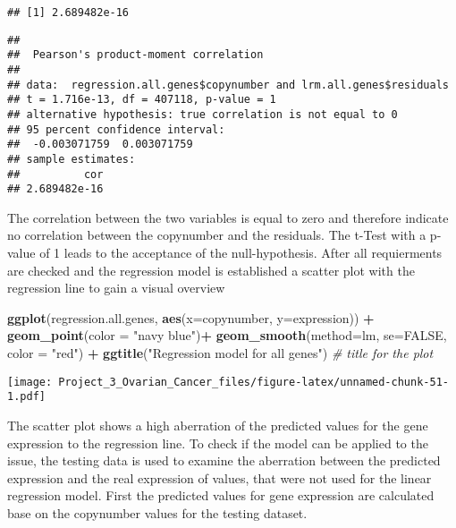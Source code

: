 \documentclass[]{article}
\newenvironment{Shaded}{\begin{snugshade}}{\end{snugshade}}
\newcommand{\CommentTok}[1]{\textcolor[rgb]{0.56,0.35,0.01}{\textit{#1}}}
\newcommand{\DataTypeTok}[1]{\textcolor[rgb]{0.13,0.29,0.53}{#1}}
\newcommand{\KeywordTok}[1]{\textcolor[rgb]{0.13,0.29,0.53}{\textbf{#1}}}
\newcommand{\NormalTok}[1]{#1}
\newcommand{\OperatorTok}[1]{\textcolor[rgb]{0.81,0.36,0.00}{\textbf{#1}}}
\newcommand{\OtherTok}[1]{\textcolor[rgb]{0.56,0.35,0.01}{#1}}
\newcommand{\StringTok}[1]{\textcolor[rgb]{0.31,0.60,0.02}{#1}}
\begin{document}
\begin{verbatim}
## [1] 2.689482e-16
\end{verbatim}

\begin{Shaded}
\end{Shaded}

\begin{verbatim}
## 
##  Pearson's product-moment correlation
## 
## data:  regression.all.genes$copynumber and lrm.all.genes$residuals
## t = 1.716e-13, df = 407118, p-value = 1
## alternative hypothesis: true correlation is not equal to 0
## 95 percent confidence interval:
##  -0.003071759  0.003071759
## sample estimates:
##          cor 
## 2.689482e-16
\end{verbatim}

The correlation between the two variables is equal to zero and therefore
indicate no correlation between the copynumber and the residuals. The
t-Test with a p-value of 1 leads to the acceptance of the
null-hypothesis. After all requierments are checked and the regression
model is established a scatter plot with the regression line to gain a
visual overview

\begin{Shaded}
\begin{Highlighting}[]
\KeywordTok{ggplot}\NormalTok{(regression.all.genes, }\KeywordTok{aes}\NormalTok{(}\DataTypeTok{x=}\NormalTok{copynumber, }\DataTypeTok{y=}\NormalTok{expression)) }\OperatorTok{+}\StringTok{ }\KeywordTok{geom_point}\NormalTok{(}\DataTypeTok{color =} \StringTok{"navy blue"}\NormalTok{)}\OperatorTok{+}\StringTok{ }\KeywordTok{geom_smooth}\NormalTok{(}\DataTypeTok{method=}\NormalTok{lm, }\DataTypeTok{se=}\OtherTok{FALSE}\NormalTok{, }\DataTypeTok{color =} \StringTok{"red"}\NormalTok{) }\OperatorTok{+}\StringTok{ }\KeywordTok{ggtitle}\NormalTok{(}\StringTok{"Regression model for all genes"}\NormalTok{) }\CommentTok{# title for the plot}
\end{Highlighting}
\end{Shaded}

\texttt{[image: Project\_3\_Ovarian\_Cancer\_files/figure-latex/unnamed-chunk-51-1.pdf]}

The scatter plot shows a high aberration of the predicted values for the
gene expression to the regression line. To check if the model can be
applied to the issue, the testing data is used to examine the aberration
between the predicted expression and the real expression of values, that
were not used for the linear regression model. First the predicted
values for gene expression are calculated base on the copynumber values
for the testing dataset.
\end{document}
